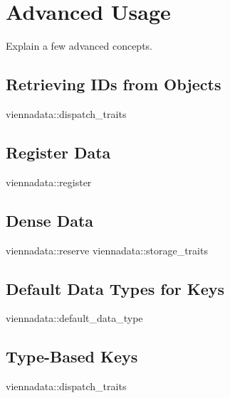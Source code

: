 \chapter{Advanced Usage} \label{chap:advanced-usage}
Explain a few advanced concepts.

\section{Retrieving IDs from Objects}
viennadata::dispatch\_traits

\section{Register Data}
viennadata::register

\section{Dense Data}
viennadata::reserve
viennadata::storage\_traits


\section{Default Data Types for Keys}
viennadata::default\_data\_type

\section{Type-Based Keys}
viennadata::dispatch\_traits
